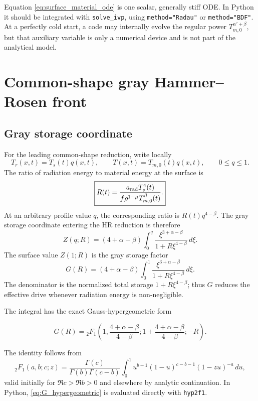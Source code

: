 \documentclass[11pt]{article}
\numberwithin{equation}{section}
\newcommand{\Ts}{T_s}
\newcommand{\Tr}{T_r}
\newcommand{\Tm}{T_{m,0}}
\newcommand{\arad}{a_{\rm rad}}
\newcommand{\dif}{\,d}
\begin{document}
Equation \eqref{eq:surface_material_ode} is one scalar, generally stiff ODE.
In Python it should be integrated with
\texttt{solve\_ivp}, using \texttt{method="Radau"} or
\texttt{method="BDF"}.  At a perfectly cold start, a code may internally
evolve the regular power $\Tm^{\alpha'+\beta}$, but that auxiliary variable is
only a numerical device and is not part of the analytical model.

\section{Common-shape gray Hammer--Rosen front}

\subsection{Gray storage coordinate}

For the leading common-shape reduction, write locally
\begin{equation}
 \Tr(x,t)=\Ts(t)q(x,t),
 \qquad
 T(x,t)=\Tm(t)q(x,t),
 \qquad 0\le q\le1.
 \label{eq:common_shape}
\end{equation}
The ratio of radiation energy to material energy at the surface is
\begin{equation}
 \boxed{
 R(t)=\frac{\arad\Ts^4(t)}
 {f\rho^{1-\mu}\Tm^\beta(t)}.}
 \label{eq:R}
\end{equation}
At an arbitrary profile value $q$, the corresponding ratio is
$R(t)q^{4-\beta}$.  The gray storage coordinate entering the HR reduction is
therefore
\begin{equation}
 Z(q;R)
 =(4+\alpha-\beta)
 \int_0^q
 \frac{\xi^{3+\alpha-\beta}}
 {1+R\xi^{4-\beta}}\dif\xi.
 \label{eq:Z_gray}
\end{equation}
The surface value $Z(1;R)$ is the gray storage factor
\begin{equation}
 \boxed{
 G(R)
 =(4+\alpha-\beta)
 \int_0^1
 \frac{\xi^{3+\alpha-\beta}}
 {1+R\xi^{4-\beta}}\dif\xi.}
 \label{eq:G_integral}
\end{equation}
The denominator is the normalized total storage
$1+R\xi^{4-\beta}$; thus $G$ reduces the effective drive whenever radiation
energy is non-negligible.

The integral has the exact Gauss-hypergeometric form
\begin{resultbox}
\begin{equation}
 \boxed{
 G(R)
 ={}_2F_1\!\left(
 1,
 \frac{4+\alpha-\beta}{4-\beta};
 1+\frac{4+\alpha-\beta}{4-\beta};
 -R
 \right).}
 \label{eq:G_hypergeometric}
\end{equation}
\end{resultbox}
The identity follows from
\begin{equation}
 {}_2F_1(a,b;c;z)
 =\frac{\Gamma(c)}{\Gamma(b)\Gamma(c-b)}
 \int_0^1
 u^{b-1}(1-u)^{c-b-1}(1-zu)^{-a}\dif u,
 \label{eq:2F1_integral}
\end{equation}
valid initially for $\Re c>\Re b>0$ and elsewhere by analytic continuation.
In Python, \eqref{eq:G_hypergeometric} is evaluated directly with
\texttt{hyp2f1}.
\end{document}
